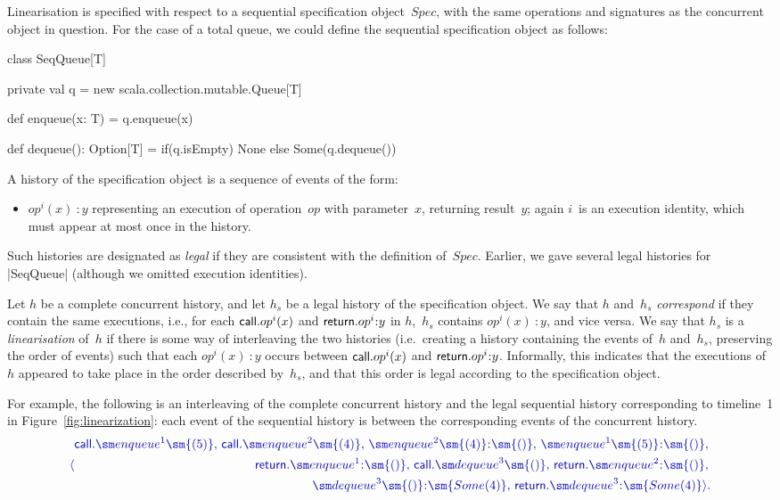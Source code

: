 Linearisation is specified with respect to a sequential specification
object~$Spec$, with the same operations and signatures as the concurrent
object in question.  For the case of a total queue, we could define the
sequential specification object as follows:
%
\begin{scala}
class SeqQueue[T]{
  private val q = new scala.collection.mutable.Queue[T]

  def enqueue(x: T) = q.enqueue(x)

  def dequeue(): Option[T] = if(q.isEmpty) None else Some(q.dequeue())
}
\end{scala}
%
A history of the specification object is a sequence of events of the form:
%
\begin{itemize}
\item $op^i(x)\::y$ representing an execution of operation~$op$ with
  parameter~$x$, returning result~$y$; again $i$~is an execution identity,
  which must appear at most once in the history.
\end{itemize}
%
Such histories are designated as \emph{legal} if they are consistent with the
definition of~$Spec$.  Earlier, we gave several legal histories for |SeqQueue|
(although we omitted execution identities).

Let $h$ be a complete concurrent history, and let $h_s$ be a legal history of
the specification object.  We say that $h$ and~$h_s$ \emph{correspond} if they
contain the same executions, i.e., for each $\mathsf{call}.op^i(x)$ and
$\return.op^i\::y$ in $h$,\, $h_s$ contains $op^i(x)\::y$, and vice versa.  We
say that $h_s$ is a \emph{linearisation} of~$h$ if there is some way of
interleaving the two histories (i.e.~creating a history containing the events
of~$h$ and~$h_s$, preserving the order of events) such that each $op^i(x)\::y$
occurs between $\mathsf{call}.op^i(x)$ and $\return.op^i\::y$.  Informally, this
indicates that the executions of~$h$ appeared to take place in the order
described by~$h_s$, and that this order is legal according to the
specification object.

For example, the following is an interleaving of the complete concurrent
history and the legal sequential history corresponding to timeline~1 in
Figure~\ref{fig:linearization}: each event of the sequential history is
between the corresponding events of the concurrent history. 
\[\mstyle
\langle
  \begin{align}
  \call.\enqueue^1\sm{(5)},\, \call.\enqueue^2\sm{(4)},\,  
  \enqueue^2\sm{(4)}\::\sm{()},\,
  \enqueue^1\sm{(5)}\::\sm{()},\, \\
\quad
  \return.\enqueue^1\::\sm{()}, \,
  \call.\dequeue^3\sm{()},\, \return.\enqueue^2\::\sm{()},\, \\
\quad
  \dequeue^3\sm{()}\::\sm{Some(4)},\,
  \return.\dequeue^3\::\sm{Some(4)} \rangle .
  \end{align}
\]

